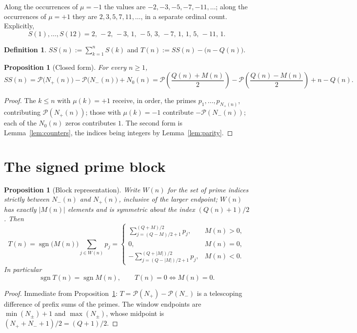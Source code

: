 \documentclass[11pt]{amsart}
\newtheorem{proposition}[theorem]{Proposition}
\theoremstyle{definition}
\newtheorem{definition}[theorem]{Definition}
\newcommand{\mob}{\mu}
\newcommand{\Mert}{M}
\newcommand{\Sq}{Q}
\newcommand{\PS}{\mathcal P}
\begin{document}
Along the occurrences of $\mob=-1$ the values are $-2,-3,-5,-7,-11,\ldots$; along
the occurrences of $\mob=+1$ they are $2,3,5,7,11,\ldots$, in a separate ordinal
count. Explicitly,
\[
S(1),\ldots,S(12)=2,\,-2,\,-3,\,1,\,-5,\,3,\,-7,\,1,\,1,\,5,\,-11,\,1 .
\]

\begin{definition}
$SS(n):=\sum_{k=1}^{n}S(k)$ and $T(n):=SS(n)-\bigl(n-\Sq(n)\bigr)$.
\end{definition}

\begin{proposition}[Closed form]\label{prop:closed}
For every $n\ge1$,
\[
\boxed{
SS(n)=\PS\bigl(N_+(n)\bigr)-\PS\bigl(N_-(n)\bigr)+N_0(n)
=
\PS\!\left(\frac{\Sq(n)+\Mert(n)}2\right)
-
\PS\!\left(\frac{\Sq(n)-\Mert(n)}2\right)
+n-\Sq(n).
}
\]
\end{proposition}

\begin{proof}
The $k\le n$ with $\mob(k)=+1$ receive, in order, the primes
$p_1,\dots,p_{N_+(n)}$, contributing $\PS(N_+(n))$; those with $\mob(k)=-1$
contribute $-\PS(N_-(n))$; each of the $N_0(n)$ zeros contributes $1$. The
second form is Lemma~\ref{lem:counters}, the indices being integers by
Lemma~\ref{lem:parity}.
\end{proof}

\section{The signed prime block}

\begin{proposition}[Block representation]\label{prop:block}
Write $W(n)$ for the set of prime indices strictly between $N_-(n)$ and
$N_+(n)$, inclusive of the larger endpoint; $W(n)$ has exactly $|\Mert(n)|$
elements and is symmetric about the index $(\Sq(n)+1)/2$. Then
\[
T(n)=\operatorname{sgn}\bigl(\Mert(n)\bigr)\sum_{j\in W(n)}p_j
=
\begin{cases}
\displaystyle\sum_{j=(\Sq-\Mert)/2+1}^{(\Sq+\Mert)/2}p_j, & \Mert(n)>0,\\[5mm]
0,& \Mert(n)=0,\\[2mm]
\displaystyle-\sum_{j=(\Sq-|\Mert|)/2+1}^{(\Sq+|\Mert|)/2}p_j, & \Mert(n)<0 .
\end{cases}
\]
In particular
\[
\operatorname{sgn}T(n)=\operatorname{sgn}\Mert(n),
\qquad
T(n)=0\iff \Mert(n)=0 .
\]
\end{proposition}

\begin{proof}
Immediate from Proposition~\ref{prop:closed}: $T=\PS(N_+)-\PS(N_-)$ is a
telescoping difference of prefix sums of the primes. The window endpoints are
$\min(N_\pm)+1$ and $\max(N_\pm)$, whose midpoint is
$(N_++N_-+1)/2=(\Sq+1)/2$.
\end{proof}
\end{document}
